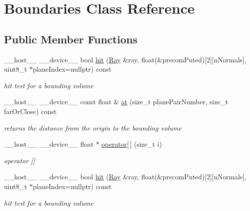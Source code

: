 \hypertarget{class_boundaries}{}\section{Boundaries Class Reference}
\label{class_boundaries}
\subsection*{Public Member Functions}
\begin{DoxyCompactItemize}
\item 
\+\_\+\+\_\+host\+\_\+\+\_\+ \+\_\+\+\_\+device\+\_\+\+\_\+ bool \hyperlink{class_boundaries_ac48b60bf0de75404bb222098a890f20c}{hit} (\hyperlink{class_ray}{Ray} \&ray, float(\&precom\+Puted)\mbox{[}2\mbox{]}\mbox{[}n\+Normals\mbox{]}, uint8\+\_\+t $\ast$plane\+Index=nullptr) const
\begin{DoxyCompactList}\small\item\em hit test for a bounding volume \end{DoxyCompactList}\item 
\+\_\+\+\_\+host\+\_\+\+\_\+ \+\_\+\+\_\+device\+\_\+\+\_\+ const float \& \hyperlink{class_boundaries_a266ff06f5e1ba1f5bc69ddf8c9506186}{at} (size\+\_\+t plane\+Pair\+Number, size\+\_\+t far\+Or\+Close) const
\begin{DoxyCompactList}\small\item\em returns the distance from the origin to the bounding volume \end{DoxyCompactList}\item 
\+\_\+\+\_\+host\+\_\+\+\_\+ \+\_\+\+\_\+device\+\_\+\+\_\+ float $\ast$ \hyperlink{class_boundaries_a76d14c4bc0572159b449b47e29987690}{operator\mbox{[}$\,$\mbox{]}} (size\+\_\+t i)
\begin{DoxyCompactList}\small\item\em operator \mbox{[}\mbox{]} \end{DoxyCompactList}\item 
\+\_\+\+\_\+host\+\_\+\+\_\+ \+\_\+\+\_\+device\+\_\+\+\_\+ bool \hyperlink{class_boundaries_ac48b60bf0de75404bb222098a890f20c}{hit} (\hyperlink{class_ray}{Ray} \&ray, float(\&precom\+Puted)\mbox{[}2\mbox{]}\mbox{[}n\+Normals\mbox{]}, uint8\+\_\+t $\ast$plane\+Index=nullptr) const
\begin{DoxyCompactList}\small\item\em hit test for a bounding volume \end{DoxyCompactList}\item 

\end{DoxyCompactItemize}

